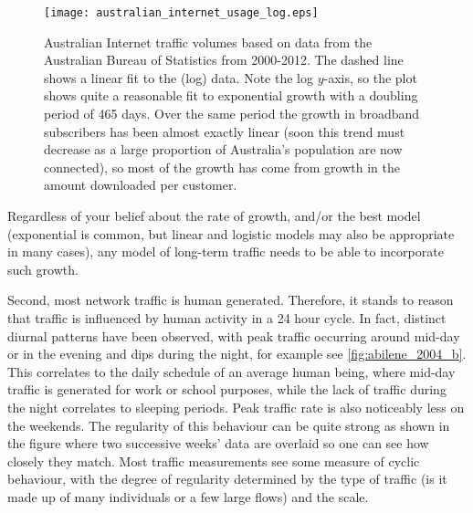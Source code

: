 \begin{figure}[!b]
  \begin{center}
    \texttt{[image: australian\_internet\_usage\_log.eps]}
    \caption{Australian Internet traffic volumes based on data from
      the Australian Bureau of Statistics from 2000-2012. The
      dashed line shows a linear fit to the (log) data.  Note
      the log $y$-axis, so the plot shows quite a reasonable fit to
      exponential growth with a doubling period of 465 days. Over the
      same period the growth in broadband subscribers has been almost
      exactly linear (soon this trend must decrease as a large
      proportion of Australia's population are now connected), so most of
      the growth has come from growth in the amount downloaded per customer.
      \label{fig:aust_traffic}}
  \end{center}
\end{figure}

Regardless of your belief about the rate of growth, and/or the best
model (exponential is common, but linear and logistic models may also
be appropriate in many cases), any model of long-term traffic needs to
be able to incorporate such growth.

Second, most network traffic is human generated. Therefore, it stands
to reason that traffic is influenced by human activity in a 24 hour
cycle. In fact, distinct diurnal patterns have been observed, with
peak traffic occurring around mid-day or in the evening and dips
during the night, for example see \autoref{fig:abilene_2004_b}. This
correlates to the daily schedule of an average human being, where
mid-day traffic is generated for work or school purposes, while the
lack of traffic during the night correlates to sleeping periods.  Peak
traffic rate is also noticeably less on the weekends.  The regularity
of this behaviour can be quite strong as shown in the figure where two
successive weeks' data are overlaid so one can see how closely they
match. Most traffic measurements see some measure of cyclic behaviour,
with the degree of regularity determined by the type of traffic (is it
made up of many individuals or a few large flows) and the scale.

    
